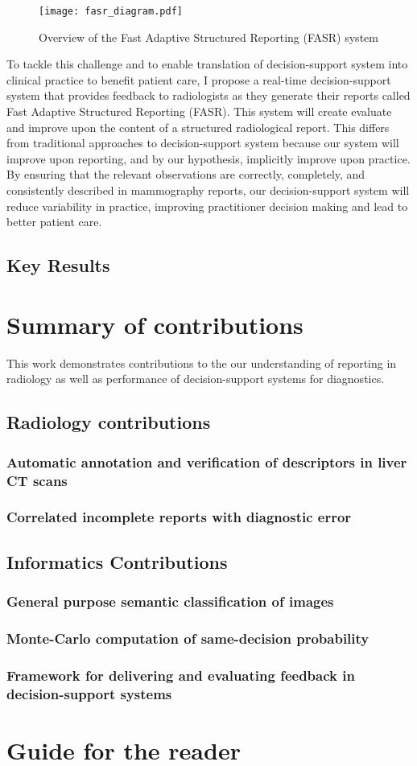 \begin{figure}[h]
	\centering
	\texttt{[image: fasr\_diagram.pdf]}
	\caption{Overview of the Fast Adaptive Structured Reporting (FASR) system}
	\label{fig:fasr_diagram}
\end{figure}

To tackle this challenge and to enable translation of decision-support system into clinical practice to benefit patient care, I propose a real-time decision-support system that provides feedback to radiologists as they generate their reports called Fast Adaptive Structured Reporting (FASR). This system will create evaluate and improve upon the content of a structured radiological report. This differs from traditional approaches to decision-support system because our system will improve upon reporting, and by our hypothesis, implicitly improve upon practice. By ensuring that the relevant observations are correctly, completely, and consistently described in mammography reports, our decision-support system will reduce variability in practice, improving practitioner decision making and lead to better patient care.

\subsection{Key Results}


\section{Summary of contributions}
This work demonstrates contributions to the our understanding of reporting in radiology as well as performance of decision-support systems for diagnostics.

\subsection{Radiology contributions}
\subsubsection{Automatic annotation and verification of descriptors in liver CT scans}
\subsubsection{Correlated incomplete reports with diagnostic error}

\subsection{Informatics Contributions}
\subsubsection{General purpose semantic classification of images}
\subsubsection{Monte-Carlo computation of same-decision probability}
\subsubsection{Framework for delivering and evaluating feedback in decision-support systems}


\section{Guide for the reader}
